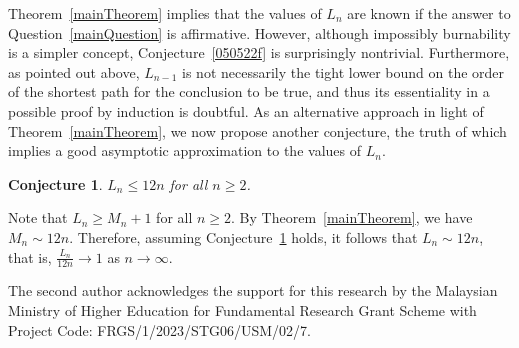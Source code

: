 \documentclass[
final
]{dmtcs-episciences}
\newtheorem{conjecture}[theorem]{Conjecture}
\theoremstyle{definition}
\theoremstyle{remark}
\begin{document}
Theorem~\ref{mainTheorem} implies that the values of $L_n$ are known if the answer to Question~\ref{mainQuestion} is affirmative.
However, although impossibly burnability is a simpler concept, Conjecture~\ref{050522f} is surprisingly nontrivial. Furthermore, as pointed out above,
$L_{n-1}$ is not necessarily the tight lower bound on the order of the shortest path for the conclusion to be true, and thus its essentiality in a possible proof by induction is doubtful.
As an alternative approach in light of Theorem~\ref{mainTheorem}, we now propose another conjecture, the truth of which implies a good asymptotic approximation to the values of $L_n$.

\begin{conjecture}\label{071222a}
	$L_n \leq 12 n$ for all $n\geq 2$. 
\end{conjecture}

Note that $L_n\geq M_n+1$ for all $n\geq 2$.
By Theorem~\ref{mainTheorem}, we have $M_n\sim 12n$.
Therefore, assuming Conjecture~\ref{071222a} holds, it follows that $L_n \sim 12n$, that is, $ \frac{L_n}{12n}\rightarrow 1$ as $n\rightarrow \infty$.




\acknowledgements
\label{sec:ack}
The second author acknowledges the support for this research by the Malaysian Ministry of Higher Education for Fundamental Research Grant Scheme with Project Code:  
FRGS/1/2023/STG06/USM/02/7. 
\end{document}
